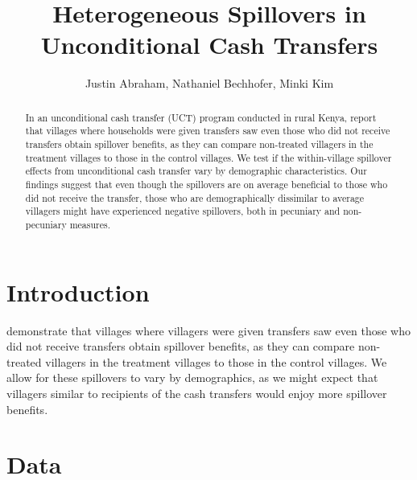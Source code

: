 \documentclass[11pt]{article}
\begin{document}
\title{Heterogeneous Spillovers in Unconditional Cash Transfers}

\author{
	Justin Abraham, Nathaniel Bechhofer, Minki Kim
}

\maketitle

	\begin{abstract}

		In an unconditional cash transfer (UCT) program conducted in rural Kenya, \textcite{haushofer_short-term_2016} report that villages where households were given transfers saw even those who did not receive transfers obtain spillover benefits, as they can compare non-treated villagers in the treatment villages to those in the control villages. We test if the within-village spillover effects from unconditional cash transfer vary by demographic characteristics. Our findings suggest that even though the spillovers are on average beneficial to those who did not receive the transfer, those who are demographically dissimilar to average villagers might have experienced negative spillovers, both in pecuniary and non-pecuniary measures.

 	\end{abstract}

\section{Introduction}

    \textcite{haushofer_short-term_2016} demonstrate that villages where villagers were given transfers saw even those who did not receive transfers obtain spillover benefits, as they can compare non-treated villagers in the treatment villages to those in the control villages. We allow for these spillovers to vary by demographics, as we might expect that villagers similar to recipients of the cash transfers would enjoy more spillover benefits.


\section{Data}
\end{document}
